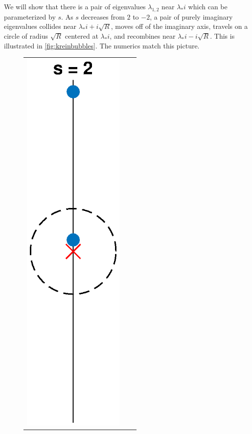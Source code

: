 \documentclass[thesis.tex]{subfiles}
\begin{document}
We will show that there is a pair of eigenvalues $\lambda_{1,2}$ near $\lambda_* i$ which can be parameterized by $s$. As $s$ decreases from $2$ to $-2$, a pair of purely imaginary eigenvalues collides near $\lambda_* i + i \sqrt{R}$, moves off of the imaginary axis, travels on a circle of radius $\sqrt{R}$ centered at $\lambda_* i$, and recombines near $\lambda_* i - i \sqrt{R}$. This is illustrated in \cref{fig:kreinbubbles}. The numerics match this picture.
\begin{figure}[H]
\begin{center}
\begin{tabular}{ccc}
\includegraphics[width=5cm]{images/kreinbubbles/bubble2R} &

\end{tabular}
\end{center}
\end{figure}
\end{document}
